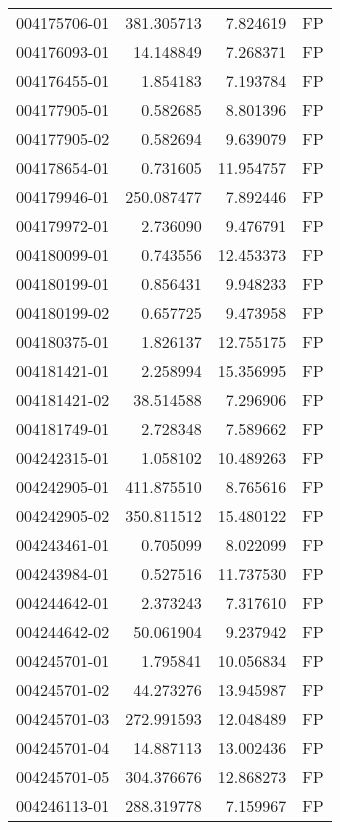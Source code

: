 \begin{tabular}{lrrl}
004175706-01 &  381.305713 &       7.824619 &   FP \\
004176093-01 &   14.148849 &       7.268371 &   FP \\
004176455-01 &    1.854183 &       7.193784 &   FP \\
004177905-01 &    0.582685 &       8.801396 &   FP \\
004177905-02 &    0.582694 &       9.639079 &   FP \\
004178654-01 &    0.731605 &      11.954757 &   FP \\
004179946-01 &  250.087477 &       7.892446 &   FP \\
004179972-01 &    2.736090 &       9.476791 &   FP \\
004180099-01 &    0.743556 &      12.453373 &   FP \\
004180199-01 &    0.856431 &       9.948233 &   FP \\
004180199-02 &    0.657725 &       9.473958 &   FP \\
004180375-01 &    1.826137 &      12.755175 &   FP \\
004181421-01 &    2.258994 &      15.356995 &   FP \\
004181421-02 &   38.514588 &       7.296906 &   FP \\
004181749-01 &    2.728348 &       7.589662 &   FP \\
004242315-01 &    1.058102 &      10.489263 &   FP \\
004242905-01 &  411.875510 &       8.765616 &   FP \\
004242905-02 &  350.811512 &      15.480122 &   FP \\
004243461-01 &    0.705099 &       8.022099 &   FP \\
004243984-01 &    0.527516 &      11.737530 &   FP \\
004244642-01 &    2.373243 &       7.317610 &   FP \\
004244642-02 &   50.061904 &       9.237942 &   FP \\
004245701-01 &    1.795841 &      10.056834 &   FP \\
004245701-02 &   44.273276 &      13.945987 &   FP \\
004245701-03 &  272.991593 &      12.048489 &   FP \\
004245701-04 &   14.887113 &      13.002436 &   FP \\
004245701-05 &  304.376676 &      12.868273 &   FP \\
004246113-01 &  288.319778 &       7.159967 &   FP \\

\end{tabular}
